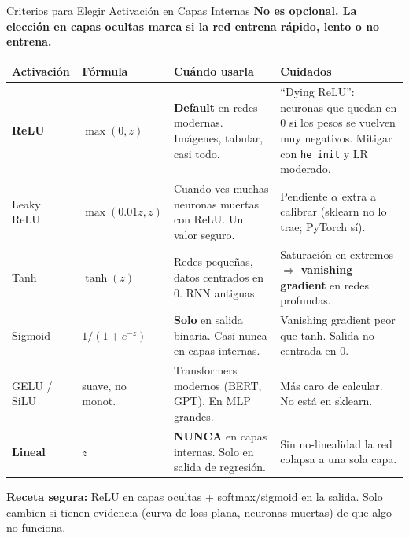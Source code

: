 \documentclass[aspectratio=169, 11pt]{beamer}
\begin{document}
\begin{frame}[shrink=18]{Criterios para Elegir Activaci\'on en Capas Internas}
  \vspace{-4pt}
  {\footnotesize\color{arcaDark}\bfseries
    No es opcional. La elecci\'on en \textbf{capas ocultas} marca
    si la red entrena r\'apido, lento o no entrena.}

  \vspace{6pt}
  {\scriptsize
  \begin{tabular}{@{}l l p{4.0cm} p{4.5cm}@{}}
    \toprule
    \textbf{Activaci\'on} & \textbf{F\'ormula} & \textbf{Cu\'ando usarla} & \textbf{Cuidados} \\
    \midrule
    \rowcolor{arcaGray}
    \textbf{ReLU} & $\max(0, z)$ &
      \textbf{Default} en redes modernas. Im\'agenes, tabular, casi todo. &
      ``Dying ReLU'': neuronas que quedan en 0 si los pesos se vuelven
      muy negativos. Mitigar con \texttt{he\_init} y LR moderado. \\
    Leaky ReLU & $\max(0.01z, z)$ &
      Cuando ves muchas neuronas muertas con ReLU. Un valor seguro. &
      Pendiente $\alpha$ extra a calibrar (sklearn no lo trae; PyTorch s\'i). \\
    \rowcolor{arcaGray}
    Tanh & $\tanh(z)$ &
      Redes peque\~nas, datos centrados en 0. RNN antiguas. &
      Saturaci\'on en extremos $\Rightarrow$ \textbf{vanishing gradient}
      en redes profundas. \\
    Sigmoid & $1/(1{+}e^{-z})$ &
      \textbf{Solo} en salida binaria. Casi nunca en capas internas. &
      Vanishing gradient peor que tanh. Salida no centrada en 0. \\
    \rowcolor{arcaGray}
    GELU / SiLU & suave, no monot. &
      Transformers modernos (BERT, GPT). En MLP grandes. &
      M\'as caro de calcular. No est\'a en sklearn. \\
    \textbf{Lineal} & $z$ &
      \textbf{NUNCA} en capas internas. Solo en salida de regresi\'on. &
      Sin no-linealidad la red colapsa a una sola capa.\\
    \bottomrule
  \end{tabular}
  }

  \vspace{4pt}
  \begin{tcolorbox}[colback=codeGreen!8, colframe=codeGreen, boxrule=0.5pt,
    arc=2pt, left=6pt, right=6pt, top=4pt, bottom=4pt]
    {\scriptsize\color{arcaDark}
    \faKey\hspace{4pt}\textbf{Receta segura:} ReLU en capas ocultas
    + softmax/sigmoid en la salida. Solo cambien si tienen evidencia
    (curva de loss plana, neuronas muertas) de que algo no funciona.}
  \end{tcolorbox}
\end{frame}
\end{document}
